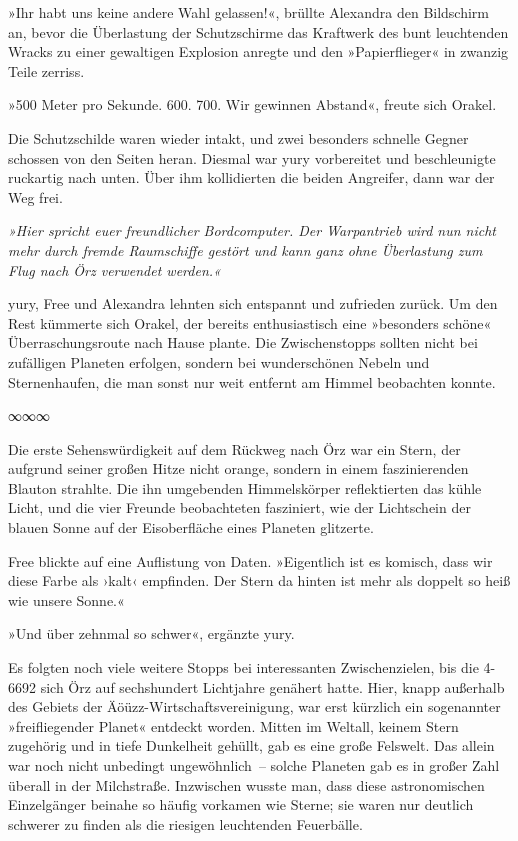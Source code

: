 »Ihr habt uns keine andere Wahl gelassen!«, brüllte Alexandra den Bildschirm an, bevor die Überlastung der Schutzschirme das Kraftwerk des bunt leuchtenden Wracks zu einer gewaltigen Explosion anregte und den »Papierflieger« in zwanzig Teile zerriss.

»500 Meter pro Sekunde. 600. 700. Wir gewinnen Abstand«, freute sich Orakel.

Die Schutzschilde waren wieder intakt, und zwei besonders schnelle Gegner schossen von den Seiten heran. Diesmal war yury vorbereitet und beschleunigte ruckartig nach unten. Über ihm kollidierten die beiden Angreifer, dann war der Weg frei.

\textit{»Hier spricht euer freundlicher Bordcomputer. Der Warpantrieb wird nun nicht mehr durch fremde Raumschiffe gestört und kann ganz ohne Überlastung zum Flug nach Örz verwendet werden.«}

yury, Free und Alexandra lehnten sich entspannt und zufrieden zurück. Um den Rest kümmerte sich Orakel, der bereits enthusiastisch eine »besonders schöne« Überraschungsroute nach Hause plante. Die Zwischenstopps sollten nicht bei zufälligen Planeten erfolgen, sondern bei wunderschönen Nebeln und Sternenhaufen, die man sonst nur weit entfernt am Himmel beobachten konnte.

\begin{center}
    ∞∞∞
\end{center}

Die erste Sehenswürdigkeit auf dem Rückweg nach Örz war ein Stern, der aufgrund seiner großen Hitze nicht orange, sondern in einem faszinierenden Blauton strahlte. Die ihn umgebenden Himmelskörper reflektierten das kühle Licht, und die vier Freunde beobachteten fasziniert, wie der Lichtschein der blauen Sonne auf der Eisoberfläche eines Planeten glitzerte.

Free blickte auf eine Auflistung von Daten. »Eigentlich ist es komisch, dass wir diese Farbe als ›kalt‹ empfinden. Der Stern da hinten ist mehr als doppelt so heiß wie unsere Sonne.«

»Und über zehnmal so schwer«, ergänzte yury.

Es folgten noch viele weitere Stopps bei interessanten Zwischenzielen, bis die 4-6692 sich Örz auf sechshundert Lichtjahre genähert hatte. Hier, knapp außerhalb des Gebiets der Äöüzz-Wirtschaftsvereinigung, war erst kürzlich ein sogenannter »freifliegender Planet« entdeckt worden. Mitten im Weltall, keinem Stern zugehörig und in tiefe Dunkelheit gehüllt, gab es eine große Felswelt. Das allein war noch nicht unbedingt ungewöhnlich~– solche Planeten gab es in großer Zahl überall in der Milchstraße. Inzwischen wusste man, dass diese astronomischen Einzelgänger beinahe so häufig vorkamen wie Sterne; sie waren nur deutlich schwerer zu finden als die riesigen leuchtenden Feuerbälle.

